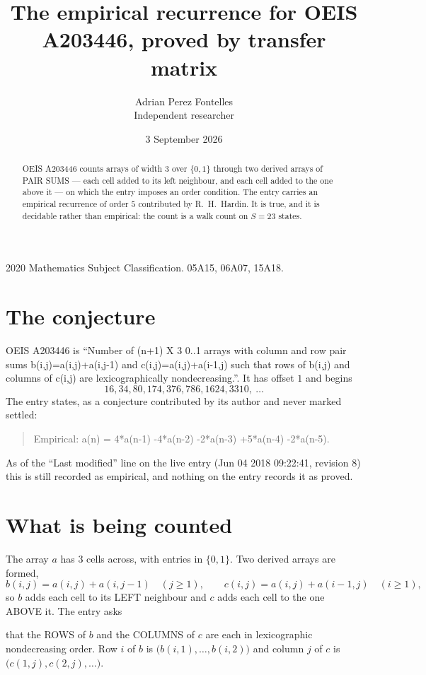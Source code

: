 \documentclass[11pt,a4paper]{article}
\title{The empirical recurrence for OEIS A203446, proved by transfer matrix}
\author{Adrian Perez Fontelles\\ \small Independent researcher}
\date{3 September 2026}
\theoremstyle{plain}
\theoremstyle{definition}
\begin{document}
\maketitle

\begin{abstract}
OEIS A203446 counts arrays of width $3$ over $\{0,1\}$ through two derived arrays of PAIR SUMS ---
each cell added to its left neighbour, and each cell added to the one above it --- on which the
entry imposes an order condition. The entry carries an empirical recurrence of order $5$
contributed by R.~H.~Hardin. It is true, and it is decidable rather than empirical: the count is
a walk count on $S=23$ states.
\end{abstract}

\noindent\small 2020 Mathematics Subject Classification. 05A15, 06A07, 15A18.\normalsize

\section{The conjecture}

OEIS A203446 is ``Number of (n+1) X 3 0..1 arrays with column and row pair sums b(i,j)=a(i,j)+a(i,j-1) and c(i,j)=a(i,j)+a(i-1,j) such that rows of b(i,j) and columns of c(i,j) are lexicographically nondecreasing.''. It has offset $1$ and begins
\[
16, 34, 80, 174, 376, 786, 1624, 3310,\ \dots
\]
The entry states, as a conjecture contributed by its author and never marked settled:
\begin{quote}
Empirical: a(n) = 4*a(n-1) -4*a(n-2) -2*a(n-3) +5*a(n-4) -2*a(n-5).
\end{quote}
As of the ``Last modified'' line on the live entry (Jun 04 2018 09:22:41, revision 8) this is still
recorded as empirical, and nothing on the entry records it as proved.

\section{What is being counted}

The array $a$ has $3$ cells across, with entries in $\{0,1\}$. Two derived arrays are formed,
\[
b(i,j)=a(i,j)+a(i,j-1)\quad(j\ge1),\qquad c(i,j)=a(i,j)+a(i-1,j)\quad(i\ge1),
\]
so $b$ adds each cell to its LEFT neighbour and $c$ adds each cell to the one ABOVE it. The
entry asks

that the ROWS of $b$ and the COLUMNS of $c$ are each in lexicographic nondecreasing order. Row $i$ of $b$
is $\bigl(b(i,1),\dots,b(i,2)\bigr)$ and column $j$ of $c$ is
$\bigl(c(1,j),c(2,j),\dots\bigr)$.
\end{document}
